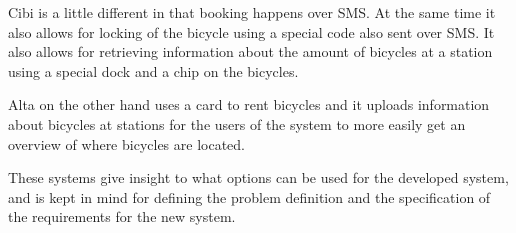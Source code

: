 Cibi is a little different in that booking happens over SMS.
At the same time it also allows for locking of the bicycle using a special code also sent over SMS.
It also allows for retrieving information about the amount of bicycles at a station using a special dock and a chip on the bicycles.

Alta on the other hand uses a card to rent bicycles and it uploads information about bicycles at stations for the users of the system to more easily get an overview of where bicycles are located.

These systems give insight to what options can be used for the developed system, and is kept in mind for defining the problem definition and the specification of the requirements for the new system.

